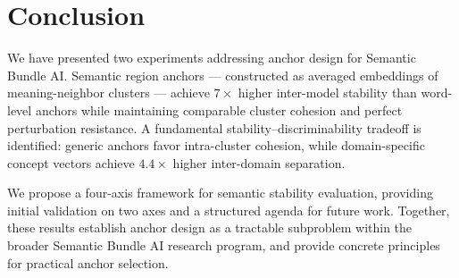 \documentclass[11pt,a4paper]{article}
\begin{document}
\section{Conclusion}
\label{sec:conclusion}

We have presented two experiments addressing anchor design for Semantic
Bundle AI. Semantic region anchors --- constructed as averaged embeddings
of meaning-neighbor clusters --- achieve $7\times$ higher inter-model
stability than word-level anchors while maintaining comparable cluster
cohesion and perfect perturbation resistance. A fundamental
stability--discriminability tradeoff is identified: generic anchors
favor intra-cluster cohesion, while domain-specific concept vectors
achieve $4.4\times$ higher inter-domain separation.

We propose a four-axis framework for semantic stability evaluation,
providing initial validation on two axes and a structured agenda for
future work. Together, these results establish anchor design as a
tractable subproblem within the broader Semantic Bundle AI research
program, and provide concrete principles for practical anchor selection.



\end{document}
